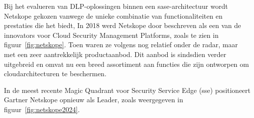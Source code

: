 Bij het evalueren van DLP-oplossingen binnen een \gls{sase}-architectuur wordt Netskope gekozen vanwege de unieke combinatie van functionaliteiten en prestaties die het biedt, 
In 2018 werd Netskope door \textcite{Hille2018} beschreven als een van de innovators voor Cloud Security Management Platforms, 
zoals te zien in figuur~\ref{fig:netskope}.  
Toen waren ze volgens \textcite{Hille2018} nog relatief onder de radar, maar met een zeer aantrekkelijk productaanbod. 
Dit aanbod is sindsdien verder uitgebreid en omvat nu een breed assortiment aan functies die zijn ontworpen om cloudarchitecturen te beschermen. 

In de meest recente Magic Quadrant voor Security Service Edge (\gls{sse}) positioneert Gartner Netskope opnieuw als Leader, zoals weergegeven in figuur~\ref{fig:netskope2024}.



